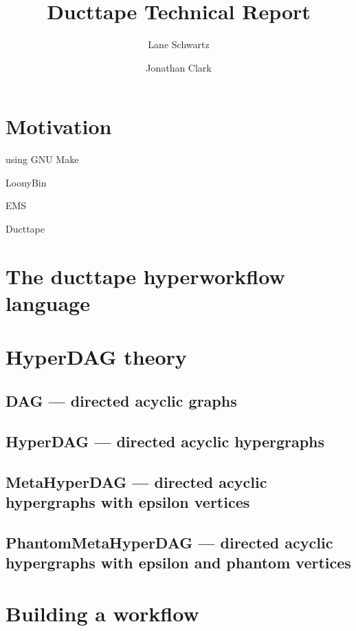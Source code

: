\documentclass{report}
\title{Ducttape Technical Report}
\author{Lane Schwartz \and Jonathan Clark}
\begin{document}
\maketitle
\tableofcontents

\chapter{Motivation}

\citep{pedersen08}


\citep{deelmanetal09}

\citep{schwartz10} using GNU Make \citep{gnumake}

LoonyBin \citep{clarklavie10,clarketal10}

EMS \citep{koehn10ems}
  
Ducttape \citep{ducttape}

\chapter{The ducttape hyperworkflow language}

\chapter{HyperDAG theory}

\section{DAG --- directed acyclic graphs}

\section{HyperDAG --- directed acyclic hypergraphs}

\section{MetaHyperDAG --- directed acyclic hypergraphs with epsilon vertices}

\section{PhantomMetaHyperDAG --- directed acyclic hypergraphs with epsilon and phantom vertices }



\chapter{Building a workflow}
\end{document}
